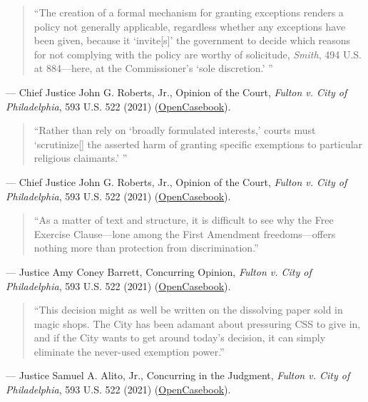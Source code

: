 \documentclass[12pt]{article}
\begin{document}
\begin{quote}
``The creation of a formal mechanism for granting exceptions renders a policy not generally applicable, regardless whether any exceptions have been given, because it `invite[s]' the government to decide which reasons for not complying with the policy are worthy of solicitude, \textit{Smith}, 494 U.S. at 884---here, at the Commissioner's `sole discretion.' ''
\end{quote}
\noindent--- Chief Justice John G. Roberts, Jr., Opinion of the Court, \textit{Fulton v. City of Philadelphia}, 593 U.S. 522 (2021) (\href{https://opencasebook.org/casebooks/4501-constitutional-law/resources/12.9-fulton-v-city-of-philadelphia-2020/}{OpenCasebook}).

\begin{quote}
``Rather than rely on `broadly formulated interests,' courts must `scrutinize[] the asserted harm of granting specific exemptions to particular religious claimants.' ''
\end{quote}
\noindent--- Chief Justice John G. Roberts, Jr., Opinion of the Court, \textit{Fulton v. City of Philadelphia}, 593 U.S. 522 (2021) (\href{https://opencasebook.org/casebooks/4501-constitutional-law/resources/12.9-fulton-v-city-of-philadelphia-2020/}{OpenCasebook}).

\begin{quote}
``As a matter of text and structure, it is difficult to see why the Free Exercise Clause---lone among the First Amendment freedoms---offers nothing more than protection from discrimination.''
\end{quote}
\noindent--- Justice Amy Coney Barrett, Concurring Opinion, \textit{Fulton v. City of Philadelphia}, 593 U.S. 522 (2021) (\href{https://opencasebook.org/casebooks/4501-constitutional-law/resources/12.9-fulton-v-city-of-philadelphia-2020/}{OpenCasebook}).

\begin{quote}
``This decision might as well be written on the dissolving paper sold in magic shops. The City has been adamant about pressuring CSS to give in, and if the City wants to get around today's decision, it can simply eliminate the never-used exemption power.''
\end{quote}
\noindent--- Justice Samuel A. Alito, Jr., Concurring in the Judgment, \textit{Fulton v. City of Philadelphia}, 593 U.S. 522 (2021) (\href{https://opencasebook.org/casebooks/4501-constitutional-law/resources/12.9-fulton-v-city-of-philadelphia-2020/}{OpenCasebook}).
\end{document}

